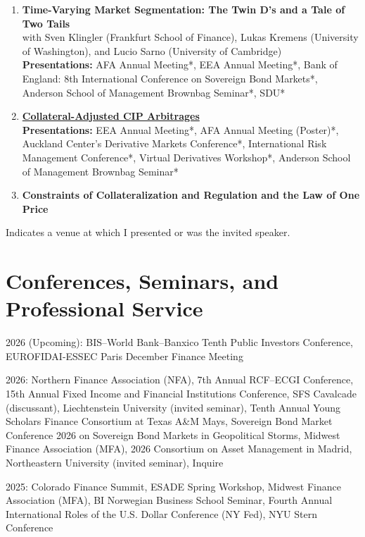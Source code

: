 \documentclass[11pt]{article}
\begin{document}
\begin{enumerate}[leftmargin=1.5em, itemsep=8pt]
\item \textbf{Time-Varying Market Segmentation: The Twin D's and a Tale of Two Tails}\\
with Sven Klingler (Frankfurt School of Finance), Lukas Kremens (University of Washington), and Lucio Sarno (University of Cambridge)\\
\textbf{Presentations:} AFA Annual Meeting*, EEA Annual Meeting*, Bank of England: 8th International Conference on Sovereign Bond Markets*, Anderson School of Management Brownbag Seminar*, SDU*

\item \textbf{\href{https://ssrn.com/abstract=3629178}{Collateral-Adjusted CIP Arbitrages}}\\
\textbf{Presentations:} EEA Annual Meeting*, AFA Annual Meeting (Poster)*, Auckland Center's Derivative Markets Conference*, International Risk Management Conference*, Virtual Derivatives Workshop*, Anderson School of Management Brownbag Seminar*

\item \textbf{Constraints of Collateralization and Regulation and the Law of One Price}

\end{enumerate}

\smallskip
{\small * Indicates a venue at which I presented or was the invited speaker.}

\section{Conferences, Seminars, and Professional Service}
2026 (Upcoming): BIS--World Bank--Banxico Tenth Public Investors Conference, EUROFIDAI-ESSEC Paris December Finance Meeting

2026: Northern Finance Association (NFA), 7th Annual RCF--ECGI Conference, 15th Annual Fixed Income and Financial Institutions Conference, SFS Cavalcade (discussant), Liechtenstein University (invited seminar), Tenth Annual Young Scholars Finance Consortium at Texas A\&M Mays, Sovereign Bond Market Conference 2026 on Sovereign Bond Markets in Geopolitical Storms, Midwest Finance Association (MFA), 2026 Consortium on Asset Management in Madrid, Northeastern University (invited seminar), Inquire

2025: Colorado Finance Summit, ESADE Spring Workshop, Midwest Finance Association (MFA), BI Norwegian Business School Seminar, Fourth Annual International Roles of the U.S. Dollar Conference (NY Fed), NYU Stern Conference
\end{document}
